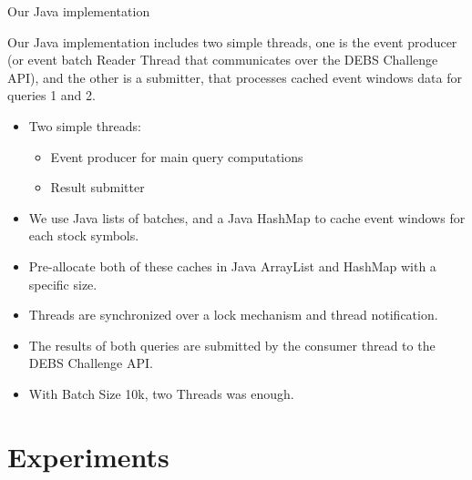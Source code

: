 \documentclass[9pt]{beamer}
\begin{document}
\begin{frame}[fragile]{Our Java implementation }
    
    Our Java implementation includes two simple threads, one is the event producer (or event batch Reader Thread that communicates over the DEBS Challenge API), and the other is a submitter, that processes cached event windows data for queries 1 and 2. 
    \begin{itemize}
        \item Two simple threads:
        \begin{itemize}
            \item Event producer for main query computations
            \item Result submitter
        \end{itemize}
        \item We use Java lists of batches, and a Java HashMap to cache event windows for each stock symbols. 
        \item Pre-allocate both of these caches in Java ArrayList and HashMap with a specific size.
        \item Threads are synchronized over a lock mechanism and thread notification.
        \item The results of both queries are submitted by the consumer thread to the DEBS Challenge API.
        \item With Batch Size 10k, two Threads was enough. 
    \end{itemize}


    
\end{frame}





\section{Experiments}





\end{document}
